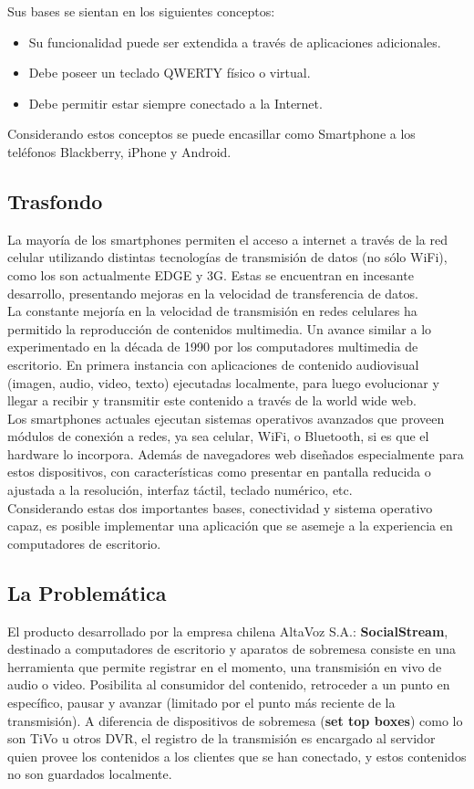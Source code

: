 Sus bases se sientan en los siguientes conceptos:
\begin{itemize}
\item Su funcionalidad puede ser extendida a través de aplicaciones adicionales.
\item Debe poseer un teclado QWERTY físico o virtual.
\item Debe permitir estar siempre conectado a la Internet.
\end{itemize}
Considerando estos conceptos se puede encasillar como Smartphone a los teléfonos Blackberry, iPhone y Android.

\subsection{Trasfondo}
La mayoría de los smartphones permiten el acceso a internet a través de la red celular utilizando distintas tecnologías de transmisión de datos (no sólo WiFi), como los son actualmente EDGE y 3G. Estas se encuentran en incesante desarrollo, presentando mejoras en la velocidad de transferencia de datos.\\

La constante mejoría en la velocidad de transmisión en redes celulares ha permitido la reproducción de contenidos multimedia. Un avance similar a lo experimentado en la década de 1990 por los computadores multimedia de escritorio. En primera instancia con aplicaciones de contenido audiovisual (imagen, audio, video, texto) ejecutadas localmente, para luego evolucionar y llegar a recibir y transmitir este contenido a través de la world wide web.\\

Los smartphones actuales ejecutan sistemas operativos avanzados que proveen módulos de conexión  a redes, ya sea celular, WiFi, o Bluetooth, si es que el hardware lo incorpora. Además de navegadores web diseñados especialmente para estos dispositivos, con características como presentar en pantalla reducida o ajustada a la resolución, interfaz táctil, teclado numérico, etc.\\

Considerando estas dos importantes bases, conectividad y sistema operativo capaz, es posible implementar una aplicación que se asemeje a la experiencia en computadores de escritorio.\\

\subsection{La Problemática}
El producto desarrollado por la empresa chilena AltaVoz S.A.: \textbf{SocialStream}, destinado a computadores de escritorio y aparatos de sobremesa consiste en una herramienta que permite registrar en el momento, una transmisión en vivo de audio o video. Posibilita al consumidor del contenido, retroceder a un punto en específico, pausar  y avanzar (limitado por el punto más reciente de la transmisión). 
A diferencia de dispositivos de sobremesa (\textbf{set top boxes}) como lo son TiVo u otros DVR, el registro de la transmisión es encargado al servidor quien provee los contenidos a los clientes que se han conectado, y estos contenidos no son guardados localmente. \\

